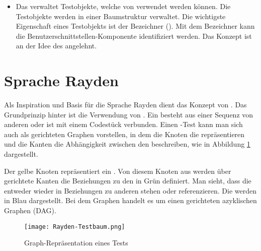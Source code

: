 \begin{itemize}
\item \textbf{}

Das  verwaltet Testobjekte, welche von  verwendet werden können. Die Testobjekte werden in einer Baumstruktur verwaltet. Die wichtigste Eigenschaft eines Testobjekts ist der Bezeichner (). Mit dem Bezeichner kann die Benutzerschnittstellen-Komponente identifiziert werden. Das Konzept ist an der Idee des  \cite{PageObject} angelehnt. \\

\end{itemize}



\section{Sprache Rayden}

Als Inspiration und Basis für die Sprache Rayden dient das Konzept von . Das Grundprinzip hinter  ist die Verwendung von . Ein  besteht aus einer Sequenz von anderen  oder ist mit einem Codestück verbunden. Einen -Test kann man sich auch als gerichteten Graphen vorstellen, in dem die Knoten die  repräsentieren und die Kanten die Abhängigkeit zwischen den  beschreiben, wie in Abbildung \ref{fig:test-graph} dargestellt.

\SuperPar
Der gelbe Knoten repräsentiert ein . Von diesem Knoten aus werden über gerichtete Kanten die Beziehungen zu den  in Grün definiert. Man sieht, dass die  entweder wieder in Beziehungen zu anderen  stehen oder  referenzieren. Die  werden in Blau dargestellt. Bei dem Graphen handelt es um einen gerichteten azyklischen Graphen (DAG).

\begin{figure}[h]
\centering
\texttt{[image: Rayden-Testbaum.png]}
\caption{Graph-Repräsentation eines Tests}
\label{fig:test-graph}
\end{figure}

